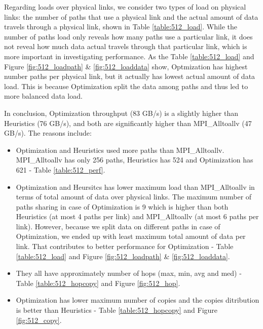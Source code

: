 \documentclass[letter]{article}
\begin{document}
Regarding loads over physical links, we consider two types of load on physical links: the number of paths that use a physical link and the actual amount of data travels through a physical link, shown in Table \ref{table:512_load}. While the number of paths load only reveals how many paths use a particular link, it does not reveal how much data actual travels through that particular link, which is more important in investigating performance. As the Table \ref{table:512_load} and Figure \ref{fig:512_loadpath} \& \ref{fig:512_loaddata}  show, Optmization has highest number paths per physical link, but it actually has lowest actual amount of data load. This is because Optimization split the data among paths and thus led to more balanced data load.

In conclusion, Optimization throughput (83 GB/s) is a slightly higher than Heuristics (76 GB/s), and both are significantly higher than MPI\_Alltoallv (47 GB/s). The reasons include:
\begin{itemize}
\item Optimization and Heuristics used more paths than MPI\_Alltoallv. MPI\_Alltoallv has only 256 paths, Heuristics has 524 and Optimization has 621 - Table \ref{table:512_perf}.
\item Optimization and Heursitcs has lower maximum load than MPI\_Alltoallv in terms of total amount of data over physical links. The maximum number of paths sharing in case of Optimization is 9 which is higher than both Heuristics (at most 4 paths per link) and MPI\_Alltoallv (at most 6 paths per link). However, because we split data on different paths in case of Optimization, we ended up with least maximum total amount of data per link. That contributes to better performance for Optimization - Table \ref{table:512_load} and Figure \ref{fig:512_loadpath} \& \ref{fig:512_loaddata}.
\item They all have approximately number of hops (max, min, avg and med) - Table \ref{table:512_hopcopy} and Figure \ref{fig:512_hop}.
\item Optimization has lower maximum number of copies and the copies ditribution is better than Heuristics - Table \ref{table:512_hopcopy} and Figure \ref{fig:512_copy}.
\end{itemize}

\newpage





\clearpage
\newpage
\end{document}
